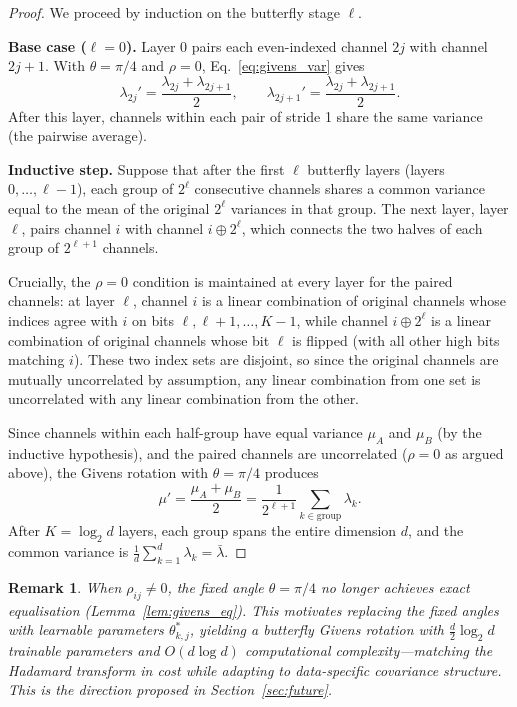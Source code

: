 \documentclass[11pt,a4paper]{article}
\newtheorem{remark}{Remark}
\begin{document}
\begin{proof}
We proceed by induction on the butterfly stage $\ell$.

\textbf{Base case ($\ell = 0$).}
Layer 0 pairs each even-indexed channel $2j$ with channel $2j + 1$.
With $\theta = \pi/4$ and $\rho = 0$, Eq.~\eqref{eq:givens_var} gives
\[
\lambda_{2j}' = \frac{\lambda_{2j} + \lambda_{2j+1}}{2}, \qquad \lambda_{2j+1}' = \frac{\lambda_{2j} + \lambda_{2j+1}}{2}.
\]
After this layer, channels within each pair of stride 1 share the same variance (the pairwise average).

\textbf{Inductive step.}
Suppose that after the first $\ell$ butterfly layers (layers $0, \ldots, \ell{-}1$), each group of $2^\ell$ consecutive channels shares a common variance equal to the mean of the original $2^\ell$ variances in that group.
The next layer, layer $\ell$, pairs channel $i$ with channel $i \oplus 2^\ell$, which connects the two halves of each group of $2^{\ell+1}$ channels.

Crucially, the $\rho = 0$ condition is maintained at every layer for the paired channels: at layer $\ell$, channel $i$ is a linear combination of original channels whose indices agree with $i$ on bits $\ell, \ell+1, \ldots, K{-}1$, while channel $i \oplus 2^\ell$ is a linear combination of original channels whose bit $\ell$ is flipped (with all other high bits matching $i$).
These two index sets are disjoint, so since the original channels are mutually uncorrelated by assumption, any linear combination from one set is uncorrelated with any linear combination from the other.

Since channels within each half-group have equal variance $\mu_A$ and $\mu_B$ (by the inductive hypothesis), and the paired channels are uncorrelated ($\rho = 0$ as argued above), the Givens rotation with $\theta = \pi/4$ produces
\[
\mu' = \frac{\mu_A + \mu_B}{2} = \frac{1}{2^{\ell+1}} \sum_{k \in \text{group}} \lambda_k.
\]
After $K = \log_2 d$ layers, each group spans the entire dimension $d$, and the common variance is $\frac{1}{d}\sum_{k=1}^{d}\lambda_k = \bar{\lambda}$.
\end{proof}

\begin{remark}
When $\rho_{ij} \neq 0$, the fixed angle $\theta = \pi/4$ no longer achieves exact equalisation (Lemma~\ref{lem:givens_eq}).
This motivates replacing the fixed angles with \emph{learnable} parameters $\theta_{k,j}^*$, yielding a butterfly Givens rotation with $\frac{d}{2}\log_2 d$ trainable parameters and $O(d \log d)$ computational complexity---matching the Hadamard transform in cost while adapting to data-specific covariance structure.
This is the direction proposed in Section~\ref{sec:future}.
\end{remark}
\end{document}
